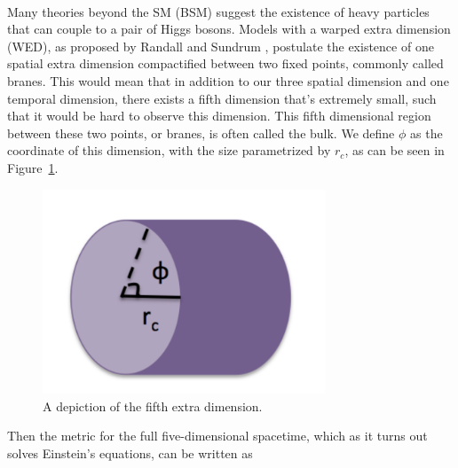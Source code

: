 
\\
\ifdefined{}\else{}\fi

Many theories beyond the SM (BSM) suggest \ifdefined{}\else{ } \fi the existence of heavy particles that can couple to a pair of Higgs bosons. 
Models with a warped extra dimension (WED), as proposed by Randall and Sundrum \cite{Randall:1999ee}, postulate the existence of one spatial extra dimension compactified between two fixed points, commonly called branes. This would mean that in addition to our three spatial dimension and one temporal dimension, there exists a fifth dimension that's extremely small, such that it would be hard to observe this dimension. This fifth dimensional region between these two points, or branes, is often called the bulk. We define $\phi$ as the coordinate of this dimension, with the size parametrized by $r_{c}$, as can be seen in Figure~\ref{Fig:Theory:RSdimension}. 
\begin{figure}
    \centering
        \includegraphics[width=0.75\textwidth]{F2/RSdimension.pdf}
        \caption{A depiction of the fifth extra dimension.}
        \label{Fig:Theory:RSdimension}
\end{figure}
Then the metric for the full five-dimensional spacetime, which as it turns out solves Einstein's equations, can be written as 
